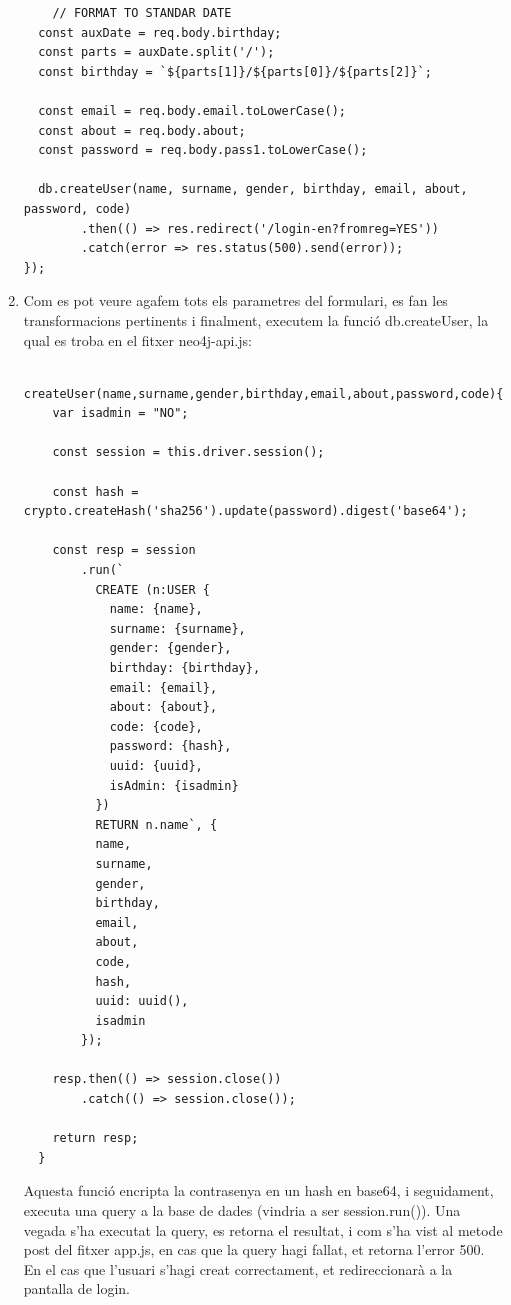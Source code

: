 \documentclass[11pt,catalan,listoffigures,listoftables]{tfgetsinf}
\begin{document}
\begin{enumerate}
\begin{lstlisting}
    // FORMAT TO STANDAR DATE
  const auxDate = req.body.birthday;
  const parts = auxDate.split('/');
  const birthday = `${parts[1]}/${parts[0]}/${parts[2]}`;

  const email = req.body.email.toLowerCase();
  const about = req.body.about;
  const password = req.body.pass1.toLowerCase();

  db.createUser(name, surname, gender, birthday, email, about, password, code)
        .then(() => res.redirect('/login-en?fromreg=YES'))
        .catch(error => res.status(500).send(error));
});
\end{lstlisting}
\item Com es pot veure agafem tots els parametres del formulari, es fan les transformacions pertinents i finalment, executem la funció db.createUser, la qual es troba en el fitxer neo4j-api.js:
\begin{lstlisting}
  createUser(name,surname,gender,birthday,email,about,password,code){
    var isadmin = "NO";

    const session = this.driver.session();

    const hash = crypto.createHash('sha256').update(password).digest('base64');

    const resp = session
        .run(`
          CREATE (n:USER {
            name: {name},
            surname: {surname},
            gender: {gender},
            birthday: {birthday},
            email: {email},
            about: {about},
            code: {code},
            password: {hash},
            uuid: {uuid},
            isAdmin: {isadmin}
          })
          RETURN n.name`, {
          name,
          surname,
          gender,
          birthday,
          email,
          about,
          code,
          hash,
          uuid: uuid(),
          isadmin
        });

    resp.then(() => session.close())
        .catch(() => session.close());

    return resp;
  }
\end{lstlisting}
Aquesta funció encripta la contrasenya en un hash en base64, i seguidament, executa una query a la base de dades (vindria a ser session.run()). Una vegada s'ha executat la query, es retorna el resultat, i com s'ha vist al metode post del fitxer app.js, en cas que la query hagi fallat, et retorna l'error 500. En el cas que l'usuari s'hagi creat correctament, et redireccionarà a la pantalla de login.
\end{enumerate}
\end{document}
